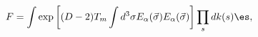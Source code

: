 \begin{equation}
F= \int \exp\left[(D-2) T_m \int d^3 \sigma E_\alpha (\vec{\sigma}) E_\alpha 
(\vec{\sigma})\right] \prod_s dk(s) \es,
\label{eq:rsltF}
\end{equation}

